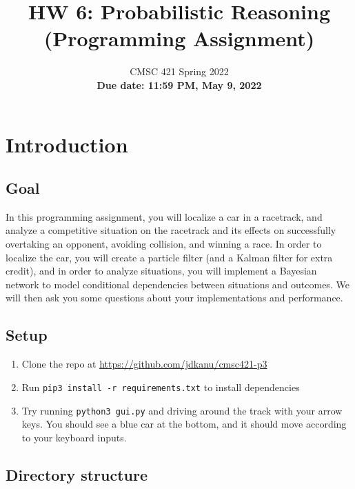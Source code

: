 \documentclass[a4paper]{article}
\title{HW 6: Probabilistic Reasoning\\ (Programming Assignment)}
\author{CMSC 421 Spring 2022\\
\textbf{Due date: 11:59 PM, May 9, 2022}}
\date{}
\theoremstyle{definition}
\theoremstyle{plain}
\begin{document}
\maketitle

\section*{Introduction}

\subsection*{Goal}

In this programming assignment, you will localize a car in a racetrack, and analyze a competitive situation on the racetrack and its effects on successfully overtaking an opponent, avoiding collision, and winning a race. In order to localize the car, you will create a particle filter (and a Kalman filter for extra credit), and in order to analyze situations, you will implement a Bayesian network to model conditional dependencies between situations and outcomes. We will then ask you some questions about your implementations and performance.

\subsection*{Setup}

\begin{enumerate}
    \item Clone the repo at \url{https://github.com/jdkanu/cmsc421-p3}
    \item Run \texttt{pip3 install -r requirements.txt} to install dependencies
    \item Try running \texttt{python3 gui.py} and driving around the track with your arrow keys. You should see a blue car at the bottom, and it should move according to your keyboard inputs.
\end{enumerate}

\subsection*{Directory structure}
\end{document}
